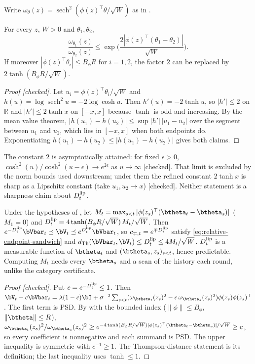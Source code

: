 Write $\omega_\theta(z)=\operatorname{sech}^2(\phi(z)^\top\theta/\sqrt W)$ as in
.

\begin{lemma}\label{lem:tanh-weight-lipschitz}
For every $z$, $W>0$ and $\theta_1,\theta_2$,
\[
\frac{\omega_{\theta_1}(z)}{\omega_{\theta_2}(z)}
\le\exp\!\Big(\frac{2|\phi(z)^\top(\theta_1-\theta_2)|}{\sqrt W}\Big).
\]
If moreover $|\phi(z)^\top\theta_i|\le B_\phi R$ for $i=1,2$, the factor $2$
can be replaced by $2\tanh(B_\phi R/\sqrt W)$.
\end{lemma}

\begin{proof}[Proof {[checked]}]
Let $u_i=\phi(z)^\top\theta_i/\sqrt W$ and $h(u)=\log\operatorname{sech}^2u=-2\log\cosh u$.
Then $h'(u)=-2\tanh u$, so $|h'|\le2$ on $\mathbb R$ and $|h'|\le2\tanh x$ on
$[-x,x]$ because $\tanh$ is odd and increasing. By the mean value theorem,
$|h(u_1)-h(u_2)|\le\sup|h'|\,|u_1-u_2|$ over the segment between $u_1$ and
$u_2$, which lies in $[-x,x]$ when both endpoints do. Exponentiating
$h(u_1)-h(u_2)\le|h(u_1)-h(u_2)|$ gives both claims.
\end{proof}

The constant $2$ is asymptotically attained: for fixed $\epsilon>0$,
$\cosh^2(u)/\cosh^2(u-\epsilon)\to e^{2\epsilon}$ as $u\to\infty$ [checked]. That
limit is excluded by the norm bounds used downstream; under them the refined
constant $2\tanh x$ is sharp as a Lipschitz constant (take $u_1,u_2\to x$)
[checked]. Neither statement is a sharpness claim about $D_t^{\rm lip}$.

\begin{corollary}\label{cor:tanh-lipschitz-endpoint}
Under the hypotheses of , let
$M_t=\max_{s<t}|\phi(z_s)^\top(\btheta_t-\btheta_s)|$ ($M_1=0$) and
$D_t^{\rm lip}=4\tanh(B_\phi R/\sqrt W)\,M_t/\sqrt W$. Then
$e^{-D_t^{\rm lip}}\bVbar_t\preceq\bV_t\preceq e^{D_t^{\rm lip}}\bVbar_t$, so
$c_{\mp,t}=e^{\mp D_t^{\rm lip}}$ satisfy \eqref{eq:relative-endpoint-sandwich}
and $d_{\rm Th}(\bVbar_t,\bV_t)\le D_t^{\rm lip}\le4M_t/\sqrt W$.
$D_t^{\rm lip}$ is a measurable function of $\btheta_t$ and $(\btheta_s,z_s)_{s<t}$,
hence predictable. Computing $M_t$ needs every $\btheta_s$ and a scan of the
history each round, unlike the category certificate.
\end{corollary}

\begin{proof}[Proof {[checked]}]
Put $c=e^{-D_t^{\rm lip}}\le1$. Then
$\bV_t-c\bVbar_t=\lambda(1-c)\bI+\sigma^{-2}\sum_{s<t}
(\omega_{\btheta_t}(z_s)^2-c\,\omega_{\btheta_s}(z_s)^2)\phi(z_s)\phi(z_s)^\top$.
The first term is PSD. By  with the bounded
index ($\|\phi\|\le B_\phi$, $\|\btheta\|\le R$),
$\omega_{\btheta_t}(z_s)^2/\omega_{\btheta_s}(z_s)^2\ge
e^{-4\tanh(B_\phi R/\sqrt W)|\phi(z_s)^\top(\btheta_t-\btheta_s)|/\sqrt W}\ge c$,
so every coefficient is nonnegative and each summand is PSD. The upper
inequality is symmetric with $c^{-1}\ge1$. The Thompson-distance statement is
its definition; the last inequality uses $\tanh\le1$.
\end{proof}

